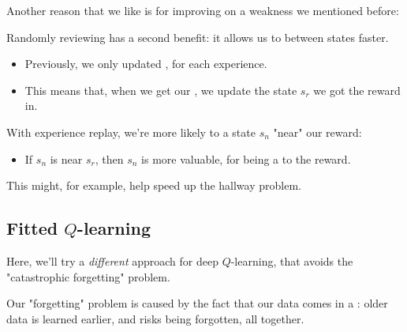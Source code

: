         Another reason that we like  is for improving on a weakness we mentioned before:\\

        \begin{concept}
            Randomly reviewing  has a second benefit: it allows us to  between states faster.

            \begin{itemize}
                \item Previously, we only updated , for each experience.
                \item This means that, when we get our , we  update the state $s_r$ we got the reward in.
            \end{itemize}

            With experience replay, we're more likely to  a state $s_n$ "near" our reward:
            
            \begin{itemize}
                \item If $s_n$ is near $s_r$, then $s_n$ is more valuable, for being a  to the reward.
            \end{itemize}

        \end{concept}


        \miniex This might, for example, help speed up the hallway problem.

       



    \pagebreak 

    \subsection{Fitted $Q$-learning}

        Here, we'll try a \textit{different} approach for deep $Q$-learning, that avoids the "catastrophic forgetting" problem.

        \subsecdiv

        Our "forgetting" problem is caused by the fact that our data comes in a : older data is learned earlier, and risks being forgotten, all together.

